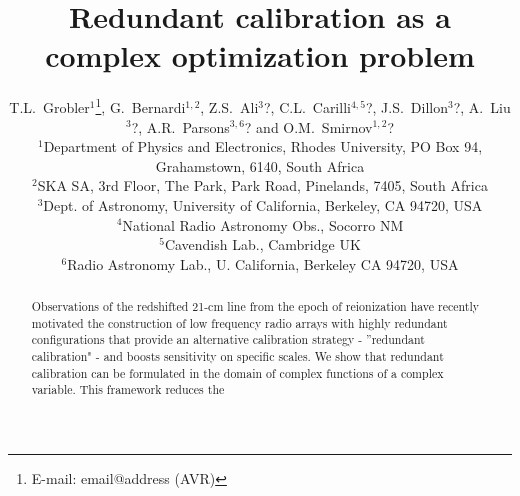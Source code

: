 \documentclass[useAMS,usenatbib]{mn2e}
\title[Unknown]{Redundant calibration as a complex optimization problem}
\author[T.L.~Grobler et al.]{T.L.~Grobler$^{1}$\thanks{E-mail: email@address (AVR)}, G.~Bernardi$^{1,2}$, Z.S.~Ali$^{3}$?, C.L.~Carilli$^{4,5}$?, J.S.~Dillon$^{3}$?, A.~Liu$^{3}$?, \newauthor
A.R.~Parsons$^{3,6}$? and O.M.~Smirnov$^{1,2}$?\\
$^{1}$Department of Physics and Electronics, Rhodes University, PO Box 94, Grahamstown, 6140, South Africa\\
$^{2}$SKA SA, 3rd Floor, The Park, Park Road, Pinelands, 7405, South Africa\\
$^{3}$Dept. of Astronomy, University of California, Berkeley, CA 94720, USA\\
$^{4}$National Radio Astronomy Obs., Socorro NM\\
$^{5}$Cavendish Lab., Cambridge UK\\
$^{6}$Radio Astronomy Lab., U. California, Berkeley CA 94720, USA}
\begin{document}

\pagerange{\pageref{firstpage}--\pageref{lastpage}} 

\maketitle

\label{firstpage}

\begin{abstract}
Observations of the redshifted 21-cm line from the epoch of reionization have recently motivated the construction of low frequency radio arrays with highly redundant configurations that provide an alternative calibration strategy - ''redundant calibration" - and boosts sensitivity on specific scales. We show that redundant calibration can be formulated in the domain of complex functions of a complex variable. This framework reduces the 


\end{abstract}
\end{document}
